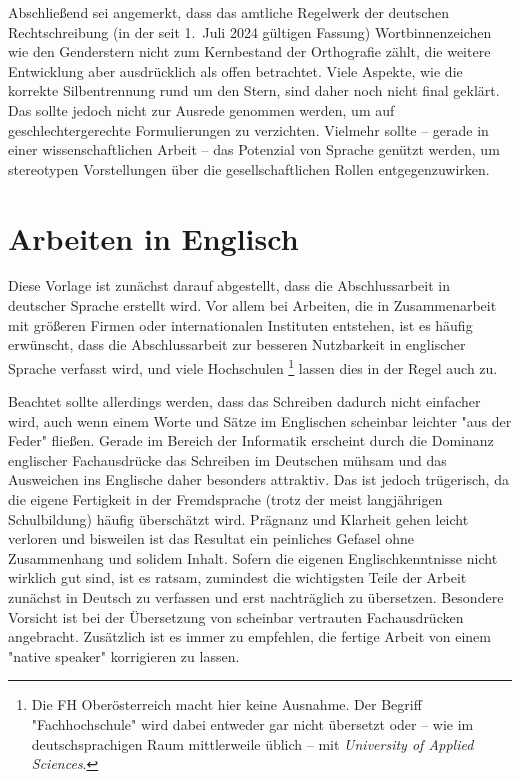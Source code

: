 Abschließend sei angemerkt, dass das amtliche Regelwerk der deutschen
Rechtschreibung (in der seit 1.~Juli 2024 gültigen Fassung) Wortbinnenzeichen
wie den Genderstern nicht zum Kernbestand der Orthografie zählt, die weitere
Entwicklung aber ausdrücklich als offen betrachtet. Viele Aspekte, wie die
korrekte Silbentrennung rund um den Stern, sind daher noch nicht final geklärt.
Das sollte jedoch nicht zur Ausrede genommen werden, um auf
geschlechtergerechte Formulierungen zu verzichten. Vielmehr sollte -- gerade in
einer wissenschaftlichen Arbeit -- das Potenzial von Sprache genützt werden, um
stereotypen Vorstellungen über die gesellschaftlichen Rollen entgegenzuwirken.


\section{Arbeiten in Englisch}
\label{sec:englisch}

Diese Vorlage ist zunächst darauf abgestellt, dass die Abschlussarbeit in
deutscher Sprache erstellt wird. Vor allem bei Arbeiten, die in
Zusammenarbeit mit größeren Firmen oder internationalen Instituten entstehen,
ist es häufig erwünscht, dass die Abschlussarbeit zur besseren Nutzbarkeit in
englischer Sprache verfasst wird, und viele Hochschulen%
\footnote{Die FH Oberösterreich macht hier keine Ausnahme. Der Begriff
"Fachhochschule" wird dabei entweder gar nicht übersetzt oder -- wie im
deutschsprachigen Raum mittlerweile üblich -- mit \emph{University of Applied
Sciences}.}
lassen dies in der Regel auch zu.

Beachtet sollte allerdings werden, dass das Schreiben dadurch nicht einfacher
wird, auch wenn einem Worte und Sätze im Englischen scheinbar leichter "aus
der Feder" fließen. Gerade im Bereich der Informatik erscheint durch die
Dominanz englischer Fachausdrücke das Schreiben im Deutschen mühsam und das
Ausweichen ins Englische daher besonders attraktiv. Das ist jedoch
trügerisch, da die eigene Fertigkeit in der Fremdsprache (trotz der meist
langjährigen Schulbildung) häufig überschätzt wird. Prägnanz und Klarheit
gehen leicht verloren und bisweilen ist das Resultat ein peinliches Gefasel
ohne Zusammenhang und solidem Inhalt. Sofern die eigenen Englischkenntnisse
nicht wirklich gut sind, ist es ratsam, zumindest die wichtigsten Teile der
Arbeit zunächst in Deutsch zu verfassen und erst nachträglich zu übersetzen.
Besondere Vorsicht ist bei der Übersetzung von scheinbar vertrauten
Fachausdrücken angebracht. Zusätzlich ist es immer zu empfehlen, die fertige
Arbeit von einem "native speaker" korrigieren zu lassen.

